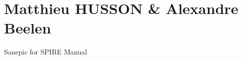 \hypertarget{index_intro_sec}{}\section{Matthieu HUSSON \& Alexandre Beelen}\label{index_intro_sec}
Sanepic for SPIRE Manual 